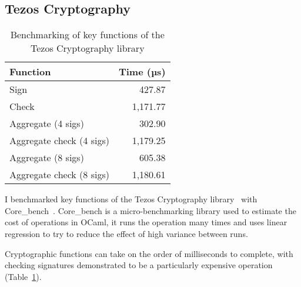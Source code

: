 \subsection{Tezos Cryptography} \label{tezosbenchmark}

\begin{table}[h]
	\centering
	\begin{tabular}{|l|r|}
	\hline
	Function                 & Time (µs) \\ \hline
	Sign                     & 427.87   \\
	Check                    & 1,171.77 \\
	Aggregate (4 sigs)       & 302.90   \\
	Aggregate check (4 sigs) & 1,179.25 \\
	Aggregate (8 sigs)       & 605.38   \\
	Aggregate check (8 sigs) & 1,180.61 \\ \hline
	\end{tabular}
	\caption{Benchmarking of key functions of the Tezos Cryptography library}
	\label{tezostable}
\end{table}

I benchmarked key functions of the Tezos Cryptography library~\cite{tezosCrypto} with Core\_bench~\cite{janestreetCoreBench2023}. Core\_bench is a micro-benchmarking library used to estimate the cost of operations in OCaml, it runs the operation many times and uses linear regression to try to reduce the effect of high variance between runs.

Cryptographic functions can take on the order of milliseconds to complete, with checking signatures demonstrated to be a particularly expensive operation (Table~\ref{tezostable}).


